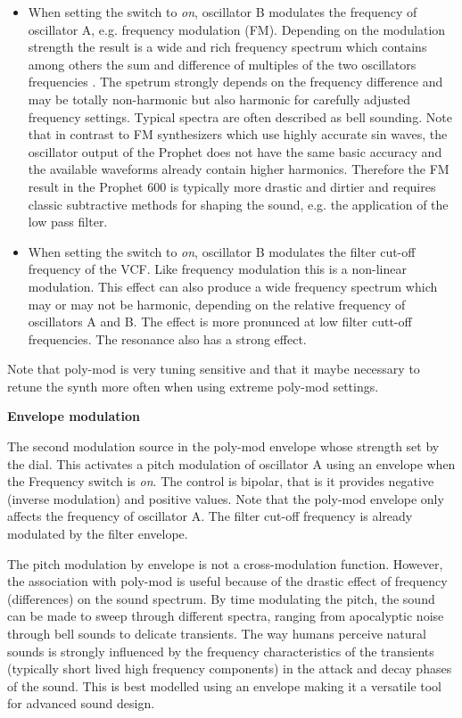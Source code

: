 \begin{itemize}
  \item When setting the \plyfreqa switch to \textit{on}, oscillator B modulates the frequency of oscillator A, e.g. frequency modulation (FM). Depending on the modulation strength the result is a wide and rich frequency spectrum which contains among others the sum and difference of multiples of the two oscillators frequencies . The spetrum strongly depends on the frequency difference and may be totally non-harmonic but also harmonic for carefully adjusted frequency settings. Typical spectra are often described as bell sounding. Note that in contrast to FM synthesizers which use highly accurate sin waves, the oscillator output of the Prophet does not have the same basic accuracy and the available waveforms already contain higher harmonics. Therefore the FM result in the Prophet 600 is typically more drastic and dirtier and requires classic subtractive methods for shaping the sound, e.g. the application of the low pass filter. 
  \item When setting the \plyfilter switch to \textit{on}, oscillator B modulates the filter cut-off frequency of the VCF. Like frequency modulation this is a non-linear modulation. This effect can also produce a wide frequency spectrum which may or may not be harmonic, depending on the relative frequency of oscillators A and B. The effect is more pronunced at low filter cutt-off frequencies. The resonance also has a strong effect.  
\end{itemize}

Note that poly-mod is very tuning sensitive and that it maybe necessary to retune the synth more often when using extreme poly-mod settings.

\textbf{Envelope modulation}

The second modulation source in the poly-mod envelope whose strength set by the \polyenv dial. This activates a pitch modulation of oscillator A using an envelope when the Frequency switch is \textit{on}. The \polyenv control is bipolar, that is it provides negative (inverse modulation) and positive values. Note that the poly-mod envelope only affects the frequency of oscillator A. The filter cut-off frequency is already modulated by the filter envelope. 

The pitch modulation by envelope is not a cross-modulation function. However, the association with poly-mod is useful because of the drastic effect of frequency (differences) on the sound spectrum. By time modulating the pitch, the sound can be made to sweep through different spectra, ranging from apocalyptic noise through bell sounds to delicate transients. The way humans perceive natural sounds is strongly influenced by the frequency characteristics of the transients (typically short lived high frequency components) in the attack and decay phases of the sound. This is best modelled using an envelope making it a versatile tool for advanced sound design. 

